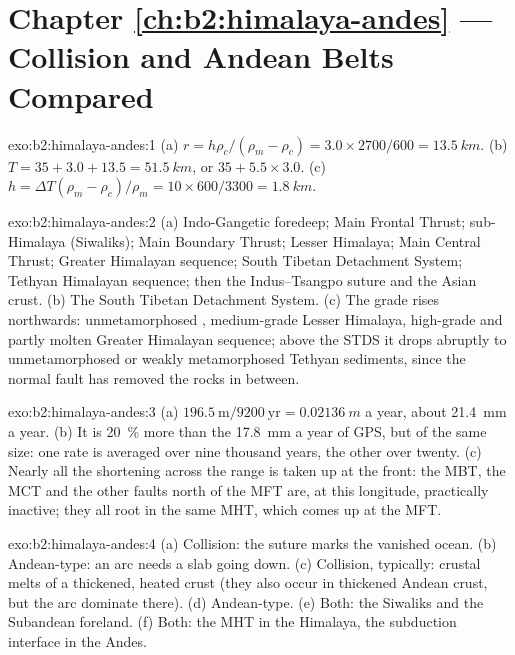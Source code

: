 \section*{Chapter \ref{ch:b2:himalaya-andes} --- Collision and Andean Belts Compared}

\begin{solution}{exo:b2:himalaya-andes:1}
(a) $r = h\rho_c/(\rho_m - \rho_c) = 3.0\times2700/600 = \qty{13.5}{km}$. (b) $T = 35 + 3.0 +
13.5 = \qty{51.5}{km}$, or $35 + 5.5\times3.0$. (c) $h = \Delta T(\rho_m - \rho_c)/\rho_m =
10\times600/3300 = \qty{1.8}{km}$.
\end{solution}

\begin{solution}{exo:b2:himalaya-andes:2}
(a) Indo-Gangetic foredeep; Main Frontal Thrust; sub-Himalaya (Siwaliks); Main Boundary
Thrust; Lesser Himalaya; Main Central Thrust; Greater Himalayan sequence; South Tibetan
Detachment System; Tethyan Himalayan sequence; then the Indus--Tsangpo suture and the Asian
crust. (b) The South Tibetan Detachment System. (c) The grade rises northwards: unmetamorphosed
, medium-grade Lesser Himalaya, high-grade and partly molten Greater Himalayan
sequence; above the STDS it drops abruptly to unmetamorphosed or weakly metamorphosed
Tethyan sediments, since the normal fault has removed the rocks in between.
\end{solution}

\begin{solution}{exo:b2:himalaya-andes:3}
(a) $196.5\ \text{m}/9200\ \text{yr} = \qty{0.02136}{m}$ a year, about \qty{21.4}{mm} a year.
(b) It is \qty{20}{\percent} more than the \qty{17.8}{mm} a year of GPS, but of the same size:
one rate is averaged over nine thousand years, the other over twenty.
(c) Nearly all the shortening across the range is taken up at the front: the MBT, the MCT and
the other faults north of the MFT are, at this longitude, practically inactive; they all root
in the same MHT, which comes up at the MFT.
\end{solution}

\begin{solution}{exo:b2:himalaya-andes:4}
(a) Collision: the suture marks the vanished ocean. (b) Andean-type: an arc needs a slab
going down. (c) Collision, typically: crustal melts of a thickened, heated crust (they also
occur in thickened Andean crust, but the arc  dominate there). (d) Andean-type.
(e) Both: the Siwaliks and the Subandean foreland. (f) Both: the MHT in the Himalaya, the
subduction interface in the Andes.
\end{solution}

